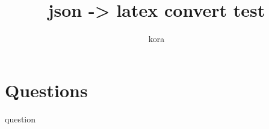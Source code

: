 \documentclass[12pt,addpoints]{exam}
\begin{document}
\title{json -> latex convert test}
\author{kora}
\date{}
\maketitle
\section*{Questions}
\begin{questions}
\pointsinrightmargin
\bracketedpoints
\question[5] question
\fillwithlines{3cm}

\end{questions}
\end{document}
